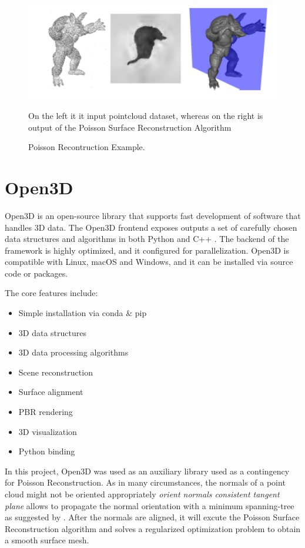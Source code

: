 \documentclass[12pt]{report}
\begin{document}
\begin{figure}[H]%
  \centering
  \includegraphics[width=1\textwidth]{poisson_example.png}
 \caption{Poisson Recontruction Example.} On the left it it input pointcloud dataset, whereas on the right is output of the Poisson Surface Reconstruction Algorithm\cite[]{Poisson}
 \label{fig:Poisson_def} 
\end{figure}




\section{Open3D}
\label{section:Open3D}
Open3D is an open-source library that supports fast development of software that handles 3D data.
The Open3D frontend exposes outputs a set of carefully chosen data structures and algorithms in both Python and C++ . 
The backend of the framework is highly optimized, and it configured for parallelization.
Open3D is compatible with Linux, macOS and Windows, and it can be installed via source code or packages. 

The core features include: 
\begin{multicols}{2}
  \begin{itemize}
    \itemsep0em 
    \item Simple installation via conda \& pip
    \item 3D data structures
    \item 3D data processing algorithms
    \item Scene reconstruction
    \item Surface alignment
    \item PBR rendering
    \item 3D visualization
    \item Python binding
  \end{itemize}
  \end{multicols}

In this project, Open3D was used as an auxiliary library used as a contingency for Poisson Reconstruction. 
As in many circumstances, the normals of a point cloud might not be oriented appropriately \textit{orient normals consistent tangent plane} allows to propagate the normal orientation with a minimum
spanning-tree as suggested by . 
After the normals are aligned, it will excute the Poisson Surface Reconstruction algorithm  and solves a regularized optimization problem to obtain a smooth surface mesh. 
\end{document}
